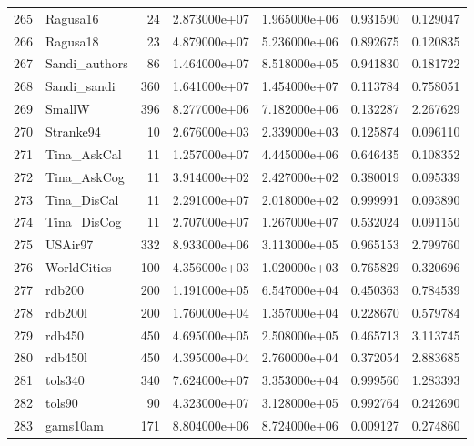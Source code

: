 \begin{tabular}{llrrrrr}
265 &                 Ragusa16 &    24 &  2.873000e+07 &  1.965000e+06 &  0.931590 &   0.129047 \\
266 &                 Ragusa18 &    23 &  4.879000e+07 &  5.236000e+06 &  0.892675 &   0.120835 \\
267 &            Sandi\_authors &    86 &  1.464000e+07 &  8.518000e+05 &  0.941830 &   0.181722 \\
268 &              Sandi\_sandi &   360 &  1.641000e+07 &  1.454000e+07 &  0.113784 &   0.758051 \\
269 &                   SmallW &   396 &  8.277000e+06 &  7.182000e+06 &  0.132287 &   2.267629 \\
270 &                Stranke94 &    10 &  2.676000e+03 &  2.339000e+03 &  0.125874 &   0.096110 \\
271 &              Tina\_AskCal &    11 &  1.257000e+07 &  4.445000e+06 &  0.646435 &   0.108352 \\
272 &              Tina\_AskCog &    11 &  3.914000e+02 &  2.427000e+02 &  0.380019 &   0.095339 \\
273 &              Tina\_DisCal &    11 &  2.291000e+07 &  2.018000e+02 &  0.999991 &   0.093890 \\
274 &              Tina\_DisCog &    11 &  2.707000e+07 &  1.267000e+07 &  0.532024 &   0.091150 \\
275 &                  USAir97 &   332 &  8.933000e+06 &  3.113000e+05 &  0.965153 &   2.799760 \\
276 &              WorldCities &   100 &  4.356000e+03 &  1.020000e+03 &  0.765829 &   0.320696 \\
277 &                   rdb200 &   200 &  1.191000e+05 &  6.547000e+04 &  0.450363 &   0.784539 \\
278 &                  rdb200l &   200 &  1.760000e+04 &  1.357000e+04 &  0.228670 &   0.579784 \\
279 &                   rdb450 &   450 &  4.695000e+05 &  2.508000e+05 &  0.465713 &   3.113745 \\
280 &                  rdb450l &   450 &  4.395000e+04 &  2.760000e+04 &  0.372054 &   2.883685 \\
281 &                  tols340 &   340 &  7.624000e+07 &  3.353000e+04 &  0.999560 &   1.283393 \\
282 &                   tols90 &    90 &  4.323000e+07 &  3.128000e+05 &  0.992764 &   0.242690 \\
283 &                 gams10am &   171 &  8.804000e+06 &  8.724000e+06 &  0.009127 &   0.274860 \\

\end{tabular}
